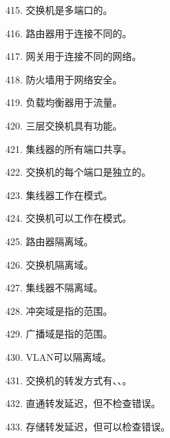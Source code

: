 415. 交换机是多端口的\underline{\hspace{2cm}}。

416. 路由器用于连接不同的\underline{\hspace{2cm}}。

417. 网关用于连接不同\underline{\hspace{2cm}}的网络。

418. 防火墙用于\underline{\hspace{2cm}}网络安全。

419. 负载均衡器用于\underline{\hspace{2cm}}流量。

420. 三层交换机具有\underline{\hspace{2cm}}功能。

421. 集线器的所有端口共享\underline{\hspace{2cm}}。

422. 交换机的每个端口是独立的\underline{\hspace{2cm}}。

423. 集线器工作在\underline{\hspace{2cm}}模式。

424. 交换机可以工作在\underline{\hspace{2cm}}模式。

425. 路由器隔离\underline{\hspace{2cm}}域。

426. 交换机隔离\underline{\hspace{2cm}}域。

427. 集线器不隔离\underline{\hspace{2cm}}域。

428. 冲突域是指\underline{\hspace{4cm}}的范围。

429. 广播域是指\underline{\hspace{4cm}}的范围。

430. VLAN可以隔离\underline{\hspace{2cm}}域。

431. 交换机的转发方式有\underline{\hspace{2cm}}、\underline{\hspace{2cm}}、\underline{\hspace{2cm}}。

432. 直通转发延迟\underline{\hspace{2cm}}，但不检查错误。

433. 存储转发延迟\underline{\hspace{2cm}}，但可以检查错误。

